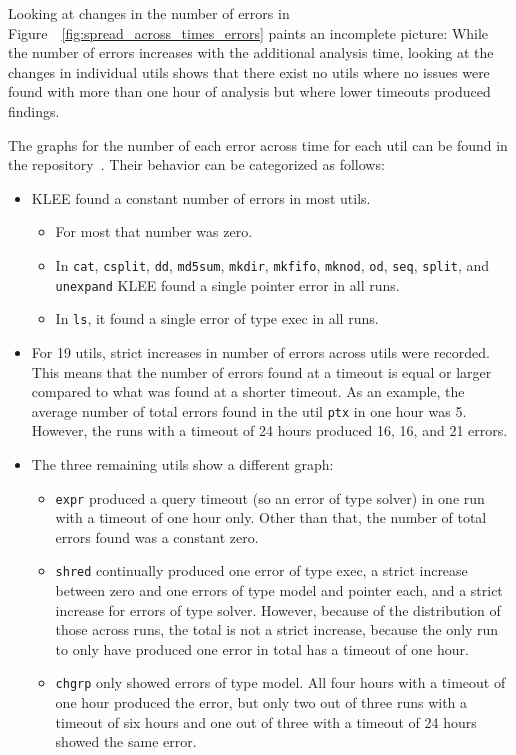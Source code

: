 \documentclass{article}
\let\savedCite=\cite
\renewcommand{\cite}{\unskip~\savedCite}
\let\savedRef=\ref
\renewcommand{\ref}{\unskip~\savedRef}
\begin{document}
Looking at changes in the number of errors in Figure~\ref{fig:spread_across_times_errors} paints an incomplete picture: While the number of errors increases with the additional analysis time, looking at the changes in individual utils shows that there exist no utils where no issues were found with more than one hour of analysis but where lower timeouts produced findings.

The graphs for the number of each error across time for each util can be found in the repository\cite{GitHub}. Their behavior can be categorized as follows:
\begin{itemize}
    \item KLEE found a constant number of errors in most utils.
          \begin{itemize}
              \item For most that number was zero.
              \item In \lstinline{cat}, \lstinline{csplit}, \lstinline{dd}, \lstinline{md5sum}, \lstinline{mkdir}, \lstinline{mkfifo}, \lstinline{mknod}, \lstinline{od}, \lstinline{seq}, \lstinline{split}, and \lstinline{unexpand} KLEE found a single pointer error in all runs.
              \item In \lstinline{ls}, it found a single error of type exec in all runs.
          \end{itemize}
    \item For 19 utils, strict increases in number of errors across utils were recorded. This means that the number of errors found at a timeout is equal or larger compared to what was found at a shorter timeout. As an example, the average number of total errors found in the util \lstinline{ptx} in one hour was 5. However, the runs with a timeout of 24 hours produced 16, 16, and 21 errors.
    \item The three remaining utils show a different graph:
          \begin{itemize}
              \item \lstinline{expr} produced a query timeout (so an error of type solver) in one run with a timeout of one hour only. Other than that, the number of total errors found was a constant zero.
              \item \lstinline{shred} continually produced one error of type exec, a strict increase between zero and one errors of type model and pointer each, and a strict increase for errors of type solver. However, because of the distribution of those across runs, the total is not a strict increase, because the only run to only have produced one error in total has a timeout of one hour.
              \item \lstinline{chgrp} only showed errors of type model. All four hours with a timeout of one hour produced the error, but only two out of three runs with a timeout of six hours and one out of three with a timeout of 24 hours showed the same error.
          \end{itemize}
\end{itemize}
\end{document}
